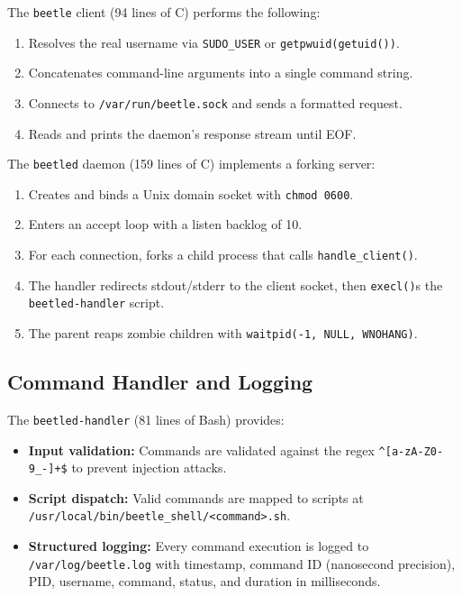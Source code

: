 The \texttt{beetle} client (94 lines of C) performs the following:
\begin{enumerate}[noitemsep]
    \item Resolves the real username via \texttt{SUDO\_USER} or \texttt{getpwuid(getuid())}.
    \item Concatenates command-line arguments into a single command string.
    \item Connects to \texttt{/var/run/beetle.sock} and sends a formatted request.
    \item Reads and prints the daemon's response stream until EOF.
\end{enumerate}

The \texttt{beetled} daemon (159 lines of C) implements a forking server:
\begin{enumerate}[noitemsep]
    \item Creates and binds a Unix domain socket with \texttt{chmod 0600}.
    \item Enters an accept loop with a listen backlog of 10.
    \item For each connection, forks a child process that calls \texttt{handle\_client()}.
    \item The handler redirects stdout/stderr to the client socket, then \texttt{execl()}s the \texttt{beetled-handler} script.
    \item The parent reaps zombie children with \texttt{waitpid(-1, NULL, WNOHANG)}.
\end{enumerate}

\subsection{Command Handler and Logging}

The \texttt{beetled-handler} (81 lines of Bash) provides:

\begin{itemize}[noitemsep]
    \item \textbf{Input validation:} Commands are validated against the regex \texttt{\^{}[a-zA-Z0-9\_-]+\$} to prevent injection attacks.
    \item \textbf{Script dispatch:} Valid commands are mapped to scripts at \texttt{/usr/local/bin/beetle\_shell/<command>.sh}.
    \item \textbf{Structured logging:} Every command execution is logged to \texttt{/var/log/beetle.log} with timestamp, command ID (nanosecond precision), PID, username, command, status, and duration in milliseconds.
\end{itemize}

